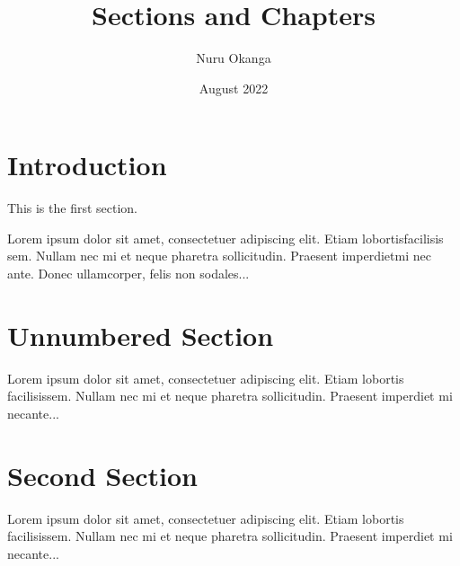 \documentclass{article}
\title{Sections and Chapters}
\author{Nuru Okanga}
\date{August 2022}
\begin{document}
	
	\maketitle
	
	\tableofcontents
	
	\section{Introduction}
	
	This is the first section.
	
	Lorem  ipsum  dolor  sit  amet,  consectetuer  adipiscing  
	elit.   Etiam  lobortisfacilisis sem.  Nullam nec mi et 
	neque pharetra sollicitudin.  Praesent imperdietmi nec ante. 
	Donec ullamcorper, felis non sodales...
	
	\section*{Unnumbered Section}
	
	Lorem ipsum dolor sit amet, consectetuer adipiscing elit.  
	Etiam lobortis facilisissem.  Nullam nec mi et neque pharetra 
	sollicitudin.  Praesent imperdiet mi necante...
	
	\section{Second Section}
	
	Lorem ipsum dolor sit amet, consectetuer adipiscing elit.  
	Etiam lobortis facilisissem.  Nullam nec mi et neque pharetra 
	sollicitudin.  Praesent imperdiet mi necante...
\end{document}
